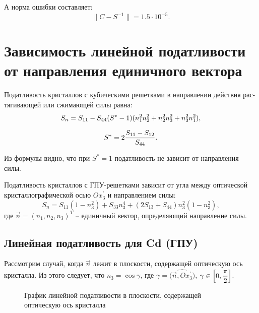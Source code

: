 \documentclass[12pt,a4paper]{article}
\begin{document}
А норма ошибки составляет:
\[
    \| C - S^{-1} \| = 1.5 \cdot 10^{-5}.
\]

\section{Зависимость линейной податливости
от направления единичного вектора}

Податливость кристаллов с кубическими решетками в направлении действия рас-
тягивающей или сжимающей силы равна:
\begin{gather}
    \label{podatCr}
    S_n=S_{11}-S_{44} (S^*-1)(n_1^2 n_2^2+n_2^2 n_3^2+n_3^2 n_1^2),
    \\[0.7em]
    S^*=2 \frac{S_{11}-S_{12}}{S_{44}}. \notag
\end{gather}

Из формулы  видно, что при $S^* = 1$ податливость не зависит от направления силы.

Податливость кристаллов с ГПУ-решетками зависит от угла между оптической кристаллографической осью $Ox^'_3$ и направлением силы:
\begin{equation}
    S_n=S_{11} (1-n_3^2)+S_{33} n_3^4+(2 S_{13}+S_{44})n_3^2(1-n_3^2),   
\end{equation}
\noindent где $\vec n = (n_1, n_2, n_3)^T$ -- единичный вектор, определяющий направление силы.

\subsection{Линейная податливость для Cd (ГПУ)}

Рассмотрим случай, когда $\vec n$ лежит в плоскости, содержащей оптическую ось кристалла. Из этого следует, что $n_3 = \cos \gamma$, где $\gamma = \widehat{\bigl(\vec n, Ox^{'}_3 \bigr)}$, $\gamma \in \Bigl[ 0, \dfrac{\pi}{2} \Bigr]$.

\pagebreak

\begin{figure}[h]
	\caption{График линейной податливости в плоскости, содержащей оптическую ось кристалла}
	\label{pic:CdOpt}
\end{figure}
\end{document}
